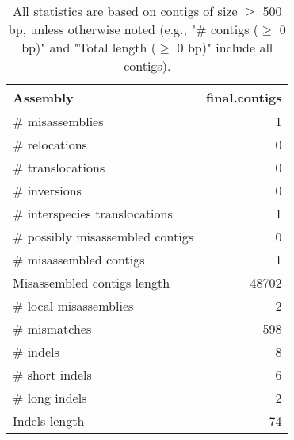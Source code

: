 \documentclass[12pt,a4paper]{article}
\begin{document}
\begin{table}[ht]
\begin{center}
\caption{All statistics are based on contigs of size $\geq$ 500 bp, unless otherwise noted (e.g., "\# contigs ($\geq$ 0 bp)" and "Total length ($\geq$ 0 bp)" include all contigs).}
\begin{tabular}{|l*{1}{|r}|}
\hline
Assembly & final.contigs \\ \hline
\# misassemblies & 1 \\ \hline
\hspace{5mm}\# relocations & 0 \\ \hline
\hspace{5mm}\# translocations & 0 \\ \hline
\hspace{5mm}\# inversions & 0 \\ \hline
\hspace{5mm}\# interspecies translocations & 1 \\ \hline
\# possibly misassembled contigs & 0 \\ \hline
\# misassembled contigs & 1 \\ \hline
Misassembled contigs length & 48702 \\ \hline
\# local misassemblies & 2 \\ \hline
\# mismatches & 598 \\ \hline
\# indels & 8 \\ \hline
\hspace{5mm}\# short indels & 6 \\ \hline
\hspace{5mm}\# long indels & 2 \\ \hline
Indels length & 74 \\ \hline
\end{tabular}
\end{center}
\end{table}
\end{document}
